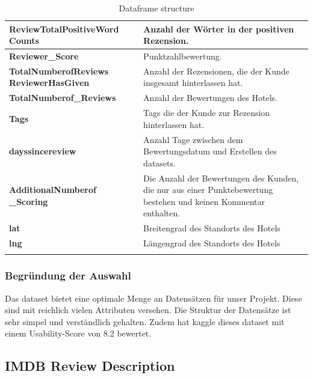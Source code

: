 \begin{longtable}[ c ]{| m{5cm} | m{8cm}|}
\textbf{ReviewTotalPositiveWord Counts}        & Anzahl der Wörter in der positiven Rezension.                                                        \\ \hline
\textbf{Reviewer\_Score}                      & Punktzahlbewertung.                                                                                  \\ \hline
\textbf{TotalNumberofReviews ReviewerHasGiven} & Anzahl der Rezensionen, die der Kunde   insgesamt hinterlassen hat.                                  \\ \hline
\textbf{TotalNumberof\_Reviews}               & Anzahl der Bewertungen des Hotels.                                                                   \\ \hline
\textbf{Tags}                                 & Tags die der Kunde zur Rezension   hinterlassen hat.                                                 \\ \hline
\textbf{dayssincereview}                      & Anzahl Tage zwischen dem Bewertungsdatum und   Erstellen des \gls{dataset}s.                              \\ \hline
\textbf{AdditionalNumberof \_Scoring} & Die Anzahl der Bewertungen des Kunden, die nur aus   einer Punktebewertung bestehen und keinen Kommentar enthalten. \\ \hline
\textbf{lat}                                  & Breitengrad des Standorts des Hotels                                                                 \\ \hline
\textbf{lng}                                  & Längengrad des Standorts des Hotels                                                                  \\ \hline
\caption{Dataframe structure}
\label{tab:Dataframe structure}\\
\end{longtable}

\subsubsection*{Begründung der Auswahl}

Das \gls{dataset} bietet eine optimale Menge an Datensätzen für unser Projekt. Diese sind mit reichlich vielen Attributen versehen. Die Struktur der Datensätze ist sehr simpel und verständlich gehalten. Zudem hat \gls{kaggle} dieses \gls{dataset} mit einem Usability-Score von 8.2 bewertet.

\subsection{IMDB Review Description}
